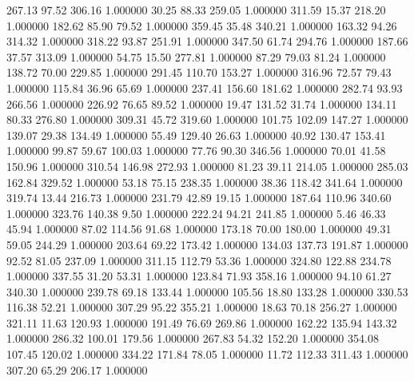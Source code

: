     267.13     97.52    306.16  1.000000
     30.25     88.33    259.05  1.000000
    311.59     15.37    218.20  1.000000
    182.62     85.90     79.52  1.000000
    359.45     35.48    340.21  1.000000
    163.32     94.26    314.32  1.000000
    318.22     93.87    251.91  1.000000
    347.50     61.74    294.76  1.000000
    187.66     37.57    313.09  1.000000
     54.75     15.50    277.81  1.000000
     87.29     79.03     81.24  1.000000
    138.72     70.00    229.85  1.000000
    291.45    110.70    153.27  1.000000
    316.96     72.57     79.43  1.000000
    115.84     36.96     65.69  1.000000
    237.41    156.60    181.62  1.000000
    282.74     93.93    266.56  1.000000
    226.92     76.65     89.52  1.000000
     19.47    131.52     31.74  1.000000
    134.11     80.33    276.80  1.000000
    309.31     45.72    319.60  1.000000
    101.75    102.09    147.27  1.000000
    139.07     29.38    134.49  1.000000
     55.49    129.40     26.63  1.000000
     40.92    130.47    153.41  1.000000
     99.87     59.67    100.03  1.000000
     77.76     90.30    346.56  1.000000
     70.01     41.58    150.96  1.000000
    310.54    146.98    272.93  1.000000
     81.23     39.11    214.05  1.000000
    285.03    162.84    329.52  1.000000
     53.18     75.15    238.35  1.000000
     38.36    118.42    341.64  1.000000
    319.74     13.44    216.73  1.000000
    231.79     42.89     19.15  1.000000
    187.64    110.96    340.60  1.000000
    323.76    140.38      9.50  1.000000
    222.24     94.21    241.85  1.000000
      5.46     46.33     45.94  1.000000
     87.02    114.56     91.68  1.000000
    173.18     70.00    180.00  1.000000
     49.31     59.05    244.29  1.000000
    203.64     69.22    173.42  1.000000
    134.03    137.73    191.87  1.000000
     92.52     81.05    237.09  1.000000
    311.15    112.79     53.36  1.000000
    324.80    122.88    234.78  1.000000
    337.55     31.20     53.31  1.000000
    123.84     71.93    358.16  1.000000
     94.10     61.27    340.30  1.000000
    239.78     69.18    133.44  1.000000
    105.56     18.80    133.28  1.000000
    330.53    116.38     52.21  1.000000
    307.29     95.22    355.21  1.000000
     18.63     70.18    256.27  1.000000
    321.11     11.63    120.93  1.000000
    191.49     76.69    269.86  1.000000
    162.22    135.94    143.32  1.000000
    286.32    100.01    179.56  1.000000
    267.83     54.32    152.20  1.000000
    354.08    107.45    120.02  1.000000
    334.22    171.84     78.05  1.000000
     11.72    112.33    311.43  1.000000
    307.20     65.29    206.17  1.000000
